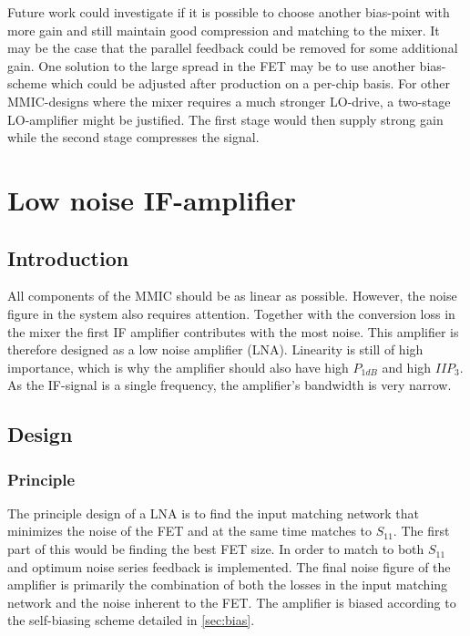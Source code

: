 		Future work could investigate if it is possible to choose another bias-point with more gain and still maintain good compression and matching to the mixer. It may be the case that the parallel feedback could be removed for some additional gain.  One solution to the large spread in the FET may be to use another bias-scheme which could be adjusted after production on a per-chip basis.
		For other MMIC-designs where the mixer requires a much stronger LO-drive, a two-stage LO-amplifier might be justified. The first stage would then supply strong gain while the second stage compresses the signal.

	\section{Low noise IF-amplifier}
		\subsection{Introduction}
			All components of the MMIC should be as linear as possible. However, the noise figure in the system also requires attention. Together with the conversion loss in the mixer the first IF amplifier contributes with the most noise. This amplifier is therefore designed as a low noise amplifier (LNA). Linearity is still of high importance, which is why the amplifier should also have high $P_{1dB}$ and high $IIP_3$. As the IF-signal is a single frequency, the amplifier's bandwidth is very narrow.

		\subsection{Design}
			\subsubsection{Principle}
				The principle design of a LNA is to find the input matching network that minimizes the noise of the FET and at the same time matches to $S_{11}$. The first part of this would be finding the best FET size. In order to match to both $S_{11}$ and optimum noise series feedback is implemented.\autocite{lehmann85} The final noise figure of the amplifier is primarily the combination of both the losses in the input matching network and the noise inherent to the FET. The amplifier is biased according to the self-biasing scheme detailed in \autoref{sec:bias}.

